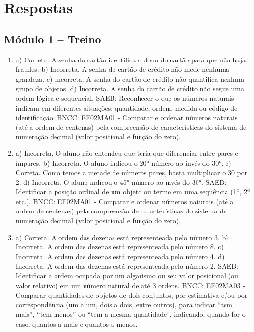 \chapter{Respostas}
\pagestyle{plain}
\footnotesize

\pagecolor{gray!40}

\section*{Módulo 1 – Treino}

\begin{enumerate}
\item
a) Correta. A senha do cartão identifica o dono do cartão para que não haja fraudes.
b) Incorreta. A senha do cartão de crédito não mede nenhuma grandeza.
c) Incorreta. A senha do cartão de crédito não quantifica nenhum grupo de objetos.
d) Incorreta. A senha do cartão de crédito não segue uma ordem lógica e sequencial.
SAEB: Reconhecer o que os números naturais indicam em diferentes
situações: quantidade, ordem, medida ou código de identificação.
BNCC: EF02MA01 - Comparar e ordenar números naturais (até a ordem de
centenas) pela compreensão de características do sistema de numeração decimal (valor
posicional e função do zero).

\item
a) Incorreta. O aluno não entendeu que teria que diferenciar entre pares e ímpares.
b) Incorreta. O aluno indicou o 20° número ao invés do 30°.
c) Correta. Como temos a metade de números pares, basta multiplicar o 30 por 2.
d) Incorreta. O aluno indicou o 45° número ao invés do 30°.
SAEB: Identificar a posição ordinal de um objeto ou termo em uma sequência (1º, 2º etc.).
BNCC: EF02MA01 - Comparar e ordenar números naturais (até a ordem de centenas) pela compreensão de características do sistema de numeração decimal (valor
posicional e função do zero).

\item
a) Correta. A ordem das dezenas está representeada pelo número 3.
b) Incorreta. A ordem das dezenas está representeada pelo número 8.
c) Incorreta. A ordem das dezenas está representeada pelo número 4.
d) Incorreta. A ordem das dezenas está representeada pelo número 2.
SAEB: Identificar a ordem ocupada por um algarismo ou seu valor posicional (ou valor relativo) em um número natural de até 3 ordens. 
BNCC: EF02MA03 - Comparar quantidades de objetos de dois conjuntos, por estimativa e/ou por correspondência (um a um, dois a dois, entre outros), para indicar ``tem mais'', ``tem menos'' ou ``tem a mesma quantidade'', indicando, quando for o caso, quantos a mais e quantos a menos.
\end{enumerate}

